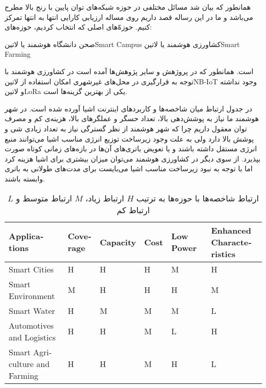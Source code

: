 

همانطور که بیان شد مسائل مختلفی در حوزه شبکه‌های توان پایین با رنج بالا مطرح می‌باشد و ما در این رساله قصد داریم روی مساله ارزیابی کارایی انتها به انتها تمرکز کنیم.
حوزه‌ّهای اصلی که انتخاب کردیم، حوزه‌های:

 صحن دانشگاه هوشمند یا ‌لاتین{Smart Campus}
 کشاورزی هوشمند یا ‌لاتین{Smart Farming}

است. همانطور که در پروژهش  و سایر پژوهش‌ها آمده است در کشاورزی هوشمند با توجه به قرارگیری در محل‌های غیرشهری امکان استفاده
از ‌لاتین{NB-IoT} وجود نداشته و ‌لاتین{LoRa} یکی از بهترین گزینه‌ها است.

در جدول  ارتباط میان شاخصه‌ها و کاربردهای اینترنت اشیا آورده شده است.
در شهر هوشمند ما نیاز به پوشش‌دهی بالا، تعداد حسگر و عملگرهای بالا، هزینه‌ی کم و مصرف توان معقول داریم چرا
که شهر هوشمند از نظر گسترگی نیاز به تعداد زیادی شی و پوشش بالا دارد ولی به علت وجود زیرساخت توزیع انرژی مناسب
اشیا می‌توانند منبع انرژی مستقل داشته باشند و یا تعویض باتری‌های آن‌ها در بازه‌های زمانی کوتاه صورت بپذیرد.
از سوی دیگر در کشاورزی هوشمند می‌توان میزان بیشتری برای اشیا هزینه کرد اما با توجه به نبود زیرساخت مناسب
اشیا می‌بایست برای مدت‌های طولانی به باتری وابسته باشند.

\begin{table}
\label{جدول: شاخصه‌ها و کاربردها}
\caption{ارتباط شاخصه‌ها با حوزه‌ها به ترتیب $H$ ارتباط زیاد، $M$ ارتباط متوسط و $L$ ارتباط کم }
\begin{latin}\begin{tabularx}
  {\textwidth}
  {|*{6}{X|}}
  \toprule
  Applications &
  Coverage &
  Capacity &
  Cost &
  Low Power &
  Enhanced Characteristics \\
  \midrule
  Smart Cities &
  H &
  H &
  H &
  M &
  H \\
  \midrule
  Smart Environment &
  M &
  H &
  H &
  H &
  M \\
  \midrule
  Smart Water &
  H &
  M &
  M &
  M &
  L \\
  \midrule
  Automotives and Logistics &
  H &
  H &
  M &
  L &
  H \\
  \midrule
  Smart Agriculture and Farming &
  H &
  H &
  M &
  H &
  L \\
  \bottomrule
\end{tabularx}\end{latin}
\end{table}

